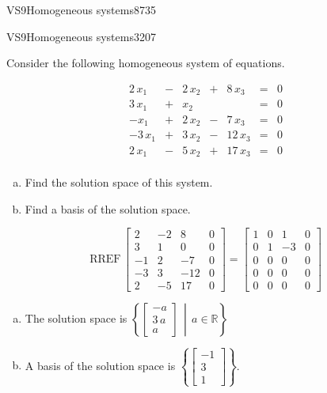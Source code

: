 \begin{exercise}{VS9}{Homogeneous systems}{8735}
\begin{exerciseAnswer}
     \end{exerciseAnswer}
 \end{exercise}


\begin{exercise}{VS9}{Homogeneous systems}{3207} 
\begin{exerciseStatement} 

Consider the following homogeneous system of equations.

 \[\begin{matrix}
 2 \, x_{1} &  -  & 2 \, x_{2} &  +  & 8 \, x_{3} & = & 0 \\
 3 \, x_{1} &  +  & x_{2} &  &  & = & 0 \\
 -x_{1} &  +  & 2 \, x_{2} &  -  & 7 \, x_{3} & = & 0 \\
 -3 \, x_{1} &  +  & 3 \, x_{2} &  -  & 12 \, x_{3} & = & 0 \\
 2 \, x_{1} &  -  & 5 \, x_{2} &  +  & 17 \, x_{3} & = & 0 \\
 \end{matrix}\] 

\begin{enumerate}[(a)]
\item  Find the solution space of this system.
\item  Find a basis of the solution space.
\end{enumerate}

     \end{exerciseStatement}
 \begin{exerciseAnswer} 

\[\mathrm{RREF}\,\left[\begin{array}{ccc|c}
2 & -2 & 8 & 0 \\
3 & 1 & 0 & 0 \\
-1 & 2 & -7 & 0 \\
-3 & 3 & -12 & 0 \\
2 & -5 & 17 & 0
\end{array}\right]=\left[\begin{array}{ccc|c}
1 & 0 & 1 & 0 \\
0 & 1 & -3 & 0 \\
0 & 0 & 0 & 0 \\
0 & 0 & 0 & 0 \\
0 & 0 & 0 & 0
\end{array}\right]\]

 

\begin{enumerate}[(a)]
\item The solution space is \( \left\{ \left[\begin{array}{c}
-a \\
3 \, a \\
a
\end{array}\right] \,\middle|\, a \in\mathbb R \right\} \) 
\item A basis of the solution space is \(\left\{ \left[\begin{array}{c}
-1 \\
3 \\
1
\end{array}\right] \right\}\).
\end{enumerate}


\end{exerciseAnswer}
\end{exercise}
